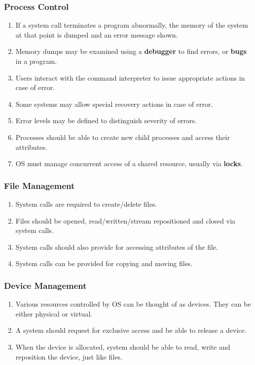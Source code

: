 \documentclass[journal,12pt,twocolumn]{IEEEtran}
\begin{document}
\subsubsection{Process Control}
\begin{enumerate}
    \item If a system call terminates a program abnormally, the memory of the 
    system at that point is dumped and an error message shown.
    \item Memory dumps may be examined using a \textbf{debugger} to find errors,
    or \textbf{bugs} in a program.
    \item Users interact with the command interpreter to issue appropriate 
    actions in case of error.
    \item Some systems may allow special recovery actions in case of error.
    \item Error levels may be defined to distinguish severity of errors.
    \item Processes should be able to create new child processes and access 
    their attributes.
    \item OS must manage concurrent access of a shared resource, usually via
    \textbf{locks}.
\end{enumerate}

\subsubsection{File Management}
\begin{enumerate}
    \item System calls are required to create/delete files.
    \item Files should be opened, read/written/stream repositioned and closed 
    via system calls.
    \item System calls should also provide for accessing attributes of the 
    file.
    \item System calls can be provided for copying and moving files.
\end{enumerate}

\subsubsection{Device Management}
\begin{enumerate}
    \item Various resources controlled by OS can be thought of as devices. They 
    can be either physical or virtual.
    \item A system should request for exclusive access and be able to release a
    device.
    \item When the device is allocated, system should be able to read, write and
    reposition the device, just like files.
\end{enumerate}
\end{document}

